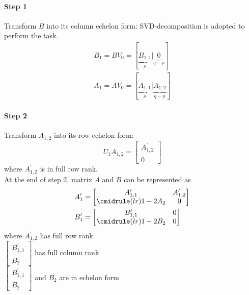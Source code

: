 \paragraph{Step 1}
Transform $B$ into its column echelon form:
SVD-decomposition is adopted to perform the task.
\begin{equation}
\begin{aligned}
    B_1 = BV_0 = [\underbrace{B_{1,1}}_{\rho} |\underbrace{0}_{q-\rho}]	\\
    A_1 = AV_0 = [\underbrace{A_{1,1}}_{\rho} |\underbrace{A_{1,2}}_{q-\rho}]
\end{aligned}
\end{equation}
%
\paragraph{Step 2}
Transform $A_{1,2}$ into its row echelon form:
\begin{equation}
    U_1A_{1,2} = 
    \begin{bmatrix}
        \underline{A^\prime_{1,2}}\\
        0
    \end{bmatrix}
\end{equation}
%
where $A^\prime_{1,2}$ is in full row rank.\\
At the end of step 2, matrix $A$ and $B$ can be represented as
\begin{equation}
\begin{aligned}
    A^\prime_1 &=
    \begin{bmatrix}
        A^\prime_{1,1} & A^\prime_{1,2} \\
        \cmidrule(lr){1-2}
        A_2 & 0
    \end{bmatrix}\\
    B^\prime_1 &=
    \begin{bmatrix}
        B^\prime_{1,1} & 0\\
        \cmidrule(lr){1-2}
        B_2 & 0
    \end{bmatrix}
\end{aligned}
\end{equation}
where $A^\prime_{1,2}$ has full row rank\\
$
\begin{bmatrix}
\underline{B^\prime_{1,1}}\\
B_2
\end{bmatrix}
$ has full column rank\\
$
\begin{bmatrix}
\underline{B^\prime_{1,1}}\\
B_2
\end{bmatrix}
$ 
and $B_2$ are in echelon form
